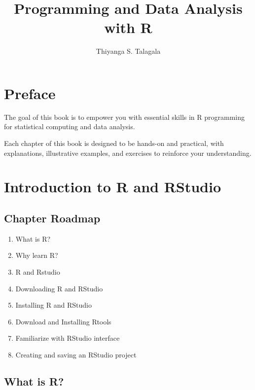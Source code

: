 \documentclass[
  letterpaper,
  DIV=11,
  numbers=noendperiod]{scrreprt}
\title{Programming and Data Analysis with R}
\author{Thiyanga S. Talagala}
\date{}
\renewcommand*\contentsname{Table of contents}
\newcommand\contentsname{Table of contents}
\begin{document}
\maketitle

\renewcommand*\contentsname{Table of contents}
{
\hypersetup{linkcolor=}
\setcounter{tocdepth}{2}
\tableofcontents
}


\chapter*{Preface}\label{preface}


The goal of this book is to empower you with essential skills in R
programming for statistical computing and data analysis.

Each chapter of this book is designed to be hands-on and practical, with
explanations, illustrative examples, and exercises to reinforce your
understanding.


\chapter{Introduction to R and
RStudio}\label{introduction-to-r-and-rstudio}

\section{Chapter Roadmap}\label{chapter-roadmap}

\begin{enumerate}
\def\labelenumi{\arabic{enumi}.}
\item
  What is R?
\item
  Why learn R?
\item
  R and Rstudio
\item
  Downloading R and RStudio
\item
  Installing R and RStudio
\item
  Download and Installing Rtools
\item
  Familiarize with RStudio interface
\item
  Creating and saving an RStudio project
\end{enumerate}

\section{What is R?}\label{what-is-r}
\end{document}
